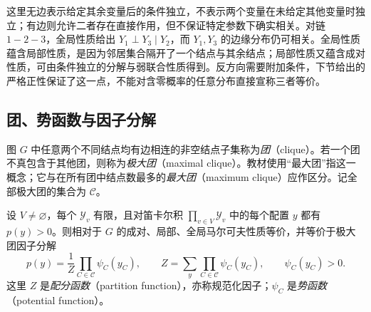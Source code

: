 这里无边表示给定其余变量后的条件独立，不表示两个变量在未给定其他变量时独立；有边则允许二者存在直接作用，但不保证特定参数下确实相关。对链 $1-2-3$，全局性质给出 $Y_1\perp Y_3\mid Y_2$，而 $Y_1,Y_3$ 的边缘分布仍可相关。全局性质蕴含局部性质，是因为邻居集合隔开了一个结点与其余结点；局部性质又蕴含成对性质，可由条件独立的分解与弱联合性质得到。反方向需要附加条件，下节给出的严格正性保证了这一点，不能对含零概率的任意分布直接宣称三者等价。

\subsection{团、势函数与因子分解}
\label{subsec:lihang-crf-factorization}

\begin{definition}
\label{def:lihang-crf-clique}
图 $G$ 中任意两个不同结点均有边相连的非空结点子集称为\emph{团}（clique）。若一个团不真包含于其他团，则称为\emph{极大团}（maximal clique）。教材使用“最大团”指这一概念；它与在所有团中结点数最多的\emph{最大团}（maximum clique）应作区分。记全部极大团的集合为 $\mathcal C$。
\end{definition}

\begin{theorem}
\label{thm:lihang-crf-hammersley-clifford}
设 $V\neq\varnothing$，每个 $\mathcal Y_v$ 有限，且对笛卡尔积 $\prod_{v\in V}\mathcal Y_v$ 中的每个配置 $y$ 都有 $p(y)>0$。则相对于 $G$ 的成对、局部、全局马尔可夫性质等价，并等价于极大团因子分解
\begin{equation}
\label{eq:lihang-crf-clique-factorization}
  p(y)=\frac1Z\prod_{C\in\mathcal C}\psi_C(y_C),\qquad
  Z=\sum_y\prod_{C\in\mathcal C}\psi_C(y_C),\qquad \psi_C(y_C)>0.
\end{equation}
这里 $Z$ 是\emph{配分函数}（partition function），亦称规范化因子；$\psi_C$ 是\emph{势函数}（potential function）。
\end{theorem}

